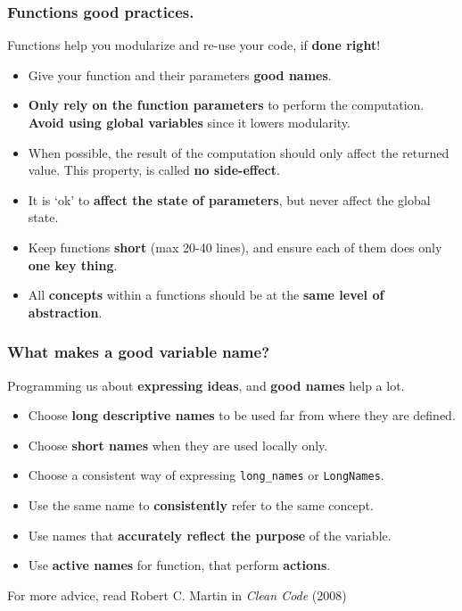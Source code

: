\documentclass{beamer} %
\newcommand\emc[1]{\textcolor{brightblue}{\textbf{#1}}}
\begin{document}
\begin{frame}
\frametitle{Functions good practices.}

Functions help you modularize and re-use your code, if \emc{done right}!
\begin{itemize}
	\item Give your function and their parameters \emc{good names}.
	\item \emc{Only rely on the function parameters} to perform the computation. \emc{Avoid using global variables} since it lowers modularity.
	\item When possible, the result of the computation should only affect the returned value. This property, is called \emc{no side-effect}.
	\item It is `ok' to \emc{affect the state of parameters}, but never affect the global state.
	\item Keep functions \emc{short} (max 20-40 lines), and ensure each of them does only \emc{one key thing}. 
	\item All \emc{concepts} within a functions should be at the \emc{same level of abstraction}.
\end{itemize}

\end{frame}

\begin{frame}
\frametitle{What makes a good variable name?}

Programming us about \emc{expressing ideas}, and \emc{good names} help a lot.

\begin{itemize}
	\item Choose \emc{long descriptive names} to be used far from where they are defined.
	\item Choose \emc{short names} when they are used locally only.
	\item Choose a consistent way of expressing \texttt{long\_names} or \texttt{LongNames}.
	\item Use the same name to \emc{consistently} refer to the same concept.
	\item Use names that \emc{accurately reflect the purpose} of the variable.
	\item Use \emc{active names} for function, that perform \emc{actions}.
\end{itemize}

For more advice, read Robert C. Martin in \emph{Clean Code} (2008)

\end{frame}
\end{document}
